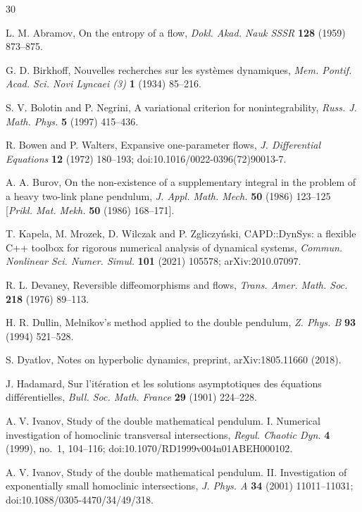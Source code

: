 \documentclass[11pt]{article}
\theoremstyle{definition}
\begin{document}
\begin{thebibliography}{30}

 L. M. Abramov, On the entropy of a flow, \emph{Dokl. Akad. Nauk SSSR} \textbf{128} (1959) 873--875.

 G. D. Birkhoff, Nouvelles recherches sur les syst\`emes dynamiques, \emph{Mem. Pontif. Acad. Sci. Novi Lyncaei (3)} \textbf{1} (1934) 85--216.

 S. V. Bolotin and P. Negrini, A variational criterion for nonintegrability, \emph{Russ. J. Math. Phys.} \textbf{5} (1997) 415--436.

 R. Bowen and P. Walters, Expansive one-parameter flows, \emph{J. Differential Equations} \textbf{12} (1972) 180--193; doi:10.1016/0022-0396(72)90013-7.

 A. A. Burov, On the non-existence of a supplementary integral in the problem of a heavy two-link plane pendulum, \emph{J. Appl. Math. Mech.} \textbf{50} (1986) 123--125 [\emph{Prikl. Mat. Mekh.} \textbf{50} (1986) 168--171].

 T. Kapela, M. Mrozek, D. Wilczak and P. Zgliczy\'nski, CAPD::DynSys: a flexible C++ toolbox for rigorous numerical analysis of dynamical systems, \emph{Commun. Nonlinear Sci. Numer. Simul.} \textbf{101} (2021) 105578; arXiv:2010.07097.

 R. L. Devaney, Reversible diffeomorphisms and flows, \emph{Trans. Amer. Math. Soc.} \textbf{218} (1976) 89--113.

 H. R. Dullin, Melnikov's method applied to the double pendulum, \emph{Z. Phys. B} \textbf{93} (1994) 521--528.

 S. Dyatlov, Notes on hyperbolic dynamics, preprint, arXiv:1805.11660 (2018).

 J. Hadamard, Sur l'it\'eration et les solutions asymptotiques des \'equations diff\'erentielles, \emph{Bull. Soc. Math. France} \textbf{29} (1901) 224--228.

 A. V. Ivanov, Study of the double mathematical pendulum. I. Numerical investigation of homoclinic transversal intersections, \emph{Regul. Chaotic Dyn.} \textbf{4} (1999), no.~1, 104--116; doi:10.1070/RD1999v004n01ABEH000102.

 A. V. Ivanov, Study of the double mathematical pendulum. II. Investigation of exponentially small homoclinic intersections, \emph{J. Phys. A} \textbf{34} (2001) 11011--11031; doi:10.1088/0305-4470/34/49/318.


\end{thebibliography}
\end{document}
